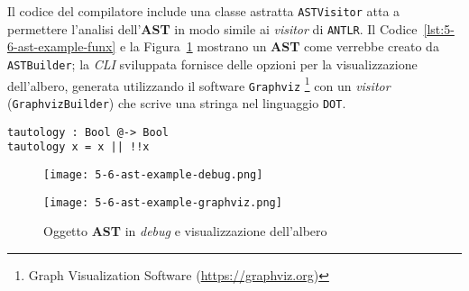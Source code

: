 \newpage

\noindent Il codice del compilatore include una classe astratta \texttt{ASTVisitor} atta a permettere l'analisi
dell'\textbf{AST} in modo simile ai \textit{visitor} di \texttt{ANTLR}.
Il Codice~\ref{lst:5-6-ast-example-funx} e la Figura~\ref{fig:5-6-ast-example-debug-graphviz}
mostrano un \textbf{AST} come verrebbe creato da \texttt{ASTBuilder}; la \textit{CLI} sviluppata fornisce
delle opzioni per la visualizzazione dell'albero, generata utilizzando il software \texttt{Graphviz}%
\footnote{Graph Visualization Software (\url{https://graphviz.org})}
con un \textit{visitor} (\texttt{GraphvizBuilder}) che scrive una stringa nel linguaggio \texttt{DOT}.

\vspace{4mm}
\begin{lstlisting}[caption={Programma in \textbf{Funx}}, style=funxCode, label={lst:5-6-ast-example-funx}]
tautology : Bool @-> Bool
tautology x = x || !!x
\end{lstlisting}

\begin{figure}
    \vspace{4mm}
    \begin{minipage}[c]{0.6\textwidth}
        \centering
        \texttt{[image: 5-6-ast-example-debug.png]}
    \end{minipage}%
    \hfill
    \begin{minipage}[c]{0.4\textwidth}
        \centering
        \texttt{[image: 5-6-ast-example-graphviz.png]}
    \end{minipage}
    \caption{Oggetto \textbf{AST} in \textit{debug} e visualizzazione dell'albero}
    \label{fig:5-6-ast-example-debug-graphviz}
\end{figure}